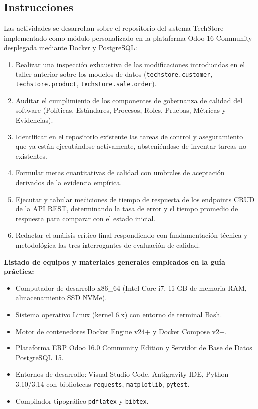 \documentclass{article}
\begin{document}
\subsection{Instrucciones}
Las actividades se desarrollan sobre el repositorio del sistema TechStore implementado como módulo personalizado en la plataforma Odoo 16 Community desplegada mediante Docker y PostgreSQL:
\begin{enumerate}
    \item Realizar una inspección exhaustiva de las modificaciones introducidas en el taller anterior sobre los modelos de datos (\texttt{techstore.customer}, \texttt{techstore.product}, \texttt{techstore.sale.order}).
    \item Auditar el cumplimiento de los componentes de gobernanza de calidad del software (Políticas, Estándares, Procesos, Roles, Pruebas, Métricas y Evidencias).
    \item Identificar en el repositorio existente las tareas de control y aseguramiento que ya están ejecutándose activamente, absteniéndose de inventar tareas no existentes.
    \item Formular metas cuantitativas de calidad con umbrales de aceptación derivados de la evidencia empírica.
    \item Ejecutar y tabular mediciones de tiempo de respuesta de los endpoints CRUD de la API REST, determinando la tasa de error y el tiempo promedio de respuesta para comparar con el estado inicial.
    \item Redactar el análisis crítico final respondiendo con fundamentación técnica y metodológica las tres interrogantes de evaluación de calidad.
\end{enumerate}

\textbf{Listado de equipos y materiales generales empleados en la guía práctica:}
\begin{itemize}
    \item Computador de desarrollo x86\_64 (Intel Core i7, 16 GB de memoria RAM, almacenamiento SSD NVMe).
    \item Sistema operativo Linux (kernel 6.x) con entorno de terminal Bash.
    \item Motor de contenedores Docker Engine v24+ y Docker Compose v2+.
    \item Plataforma ERP Odoo 16.0 Community Edition y Servidor de Base de Datos PostgreSQL 15.
    \item Entornos de desarrollo: Visual Studio Code, Antigravity IDE, Python 3.10/3.14 con bibliotecas \texttt{requests}, \texttt{matplotlib}, \texttt{pytest}.
    \item Compilador tipográfico \texttt{pdflatex} y \texttt{bibtex}.
\end{itemize}
\end{document}
